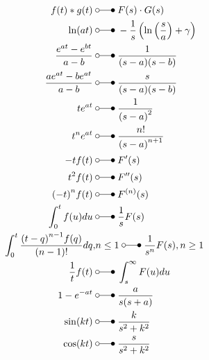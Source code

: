 \begin{align*}
    f(t)*g(t)                       \;                      & \laplace\; \begin{aligned}F(s)\cdot G(s)\end{aligned}               \\
    \ln(at)                         \;                      & \laplace\; -\frac{1}{s}\left(\ln\left(\frac sa\right)+\gamma\right) \\
    \frac{e^{at}-e^{bt}}{a-b}       \;                      & \laplace\; \frac{1}{(s-a)(s-b)}                                     \\
    \frac{ae^{at}-be^{at}}{a-b}     \;                      & \laplace\; \frac{s}{(s-a)(s-b)}                                     \\
    te^{at}                         \;                      & \laplace\; \frac{1}{{(s-a)}^2}                                      \\
    t^{n}e^{at}                     \;                      & \laplace\; \frac{n!}{{(s-a)}^{n+1}}                                 \\
    -tf(t)                          \;                      & \laplace\; F^{\prime}(s)                                            \\
    t^{2}f(t)                       \;                      & \laplace\; F^{\prime\prime}(s)                                      \\
    {(-t)}^n f(t)                   \;                      & \laplace\; F^{(n)}(s)                                               \\
    \int_{0}^{t}f(u)du              \;                      & \laplace\; \frac{1}{s}F(s)                                          \\
    \int_{0}^{t}\frac{{(t-q)}^{n-1}f(q)}{(n-1)!}dq,         & n \leq 1 \;\laplace\; \frac{1}{s^n}F(s),n \geq 1                    \\
    \frac{1}{t}f(t)                 \;                      & \laplace\; \int_{s}^{\infty}F(u)du                                  \\
    1-e^{-at}                       \;                      & \laplace\; \frac{a}{s(s+a)}                                         \\
    \sin(kt)                        \;                      & \laplace\; \frac{k}{s^2+k^2}                                        \\
    \cos(kt)                        \;                      & \laplace\; \frac{s}{s^2+k^2}                                        \\

\end{align*}
